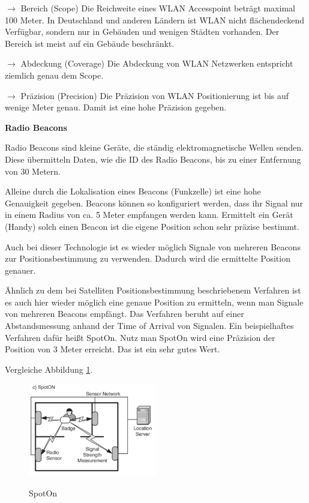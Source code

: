 \cite[S. 209-211]{Schiller2004}

$\longrightarrow$ Bereich (Scope) Die Reichweite eines WLAN Accesspoint beträgt maximal 100 Meter. In Deutschland und anderen Ländern ist WLAN nicht flächendeckend Verfügbar, sondern nur in Gebäuden und wenigen Städten vorhanden. Der Bereich ist meist auf ein Gebäude beschränkt.

$\longrightarrow$ Abdeckung (Coverage) Die Abdeckung von WLAN Netzwerken entspricht ziemlich genau dem Scope. 

$\longrightarrow$ Präzision (Precision) Die Präzision von WLAN Positionierung ist bis auf wenige Meter genau. Damit ist eine hohe Präzision gegeben.

\textbf{Radio Beacons}

Radio Beacons sind kleine Geräte, die ständig elektromagnetische Wellen senden. Diese übermitteln Daten, wie die ID des Radio Beacons, bis zu einer Entfernung von 30 Metern.

Alleine durch die Lokalisation eines Beacons (Funkzelle) ist eine hohe Genauigkeit gegeben. Beacons können so konfiguriert werden, dass ihr Signal nur in einem Radius von ca. 5 Meter empfangen werden kann. Ermittelt ein Gerät (Handy) solch einen Beacon ist die eigene Position schon sehr präzise bestimmt.

Auch bei dieser Technologie ist es wieder möglich Signale von mehreren Beacons zur Positionsbestimmung zu verwenden. Dadurch wird die ermittelte Position genauer. %

Ähnlich zu dem bei Satelliten Positionsbestimmung beschriebenem Verfahren ist es auch hier wieder möglich eine genaue Position zu ermitteln, wenn man Signale von mehreren Beacons empfängt. Das Verfahren beruht auf einer Abstandsmessung anhand der Time of Arrival von Signalen. Ein beispielhaftes Verfahren dafür heißt SpotOn.
Nutz man SpotOn wird eine Präzision der Position von 3 Meter erreicht. Das ist ein sehr gutes Wert.

\cite[S. 201 - 204]{Schiller2004}

Vergleiche Abbildung \ref{fig:SpotOn}.

\begin{figure}[h]
\centering
\includegraphics[width=0.5\textwidth]{ref/images/SpotOn.PNG}
\caption[SpotOn]{SpotOn}
\label{fig:SpotOn}
\cite[S. 201]{Schiller2004}
\end{figure}


